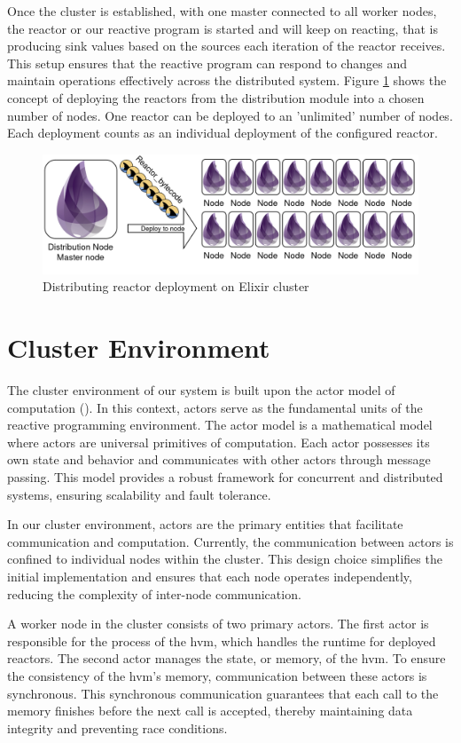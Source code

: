 \documentclass[a4paper]{book}
\begin{document}
Once the cluster is established, with one master connected to all worker nodes, the reactor or our reactive program is started and will keep on reacting, that is producing sink values based on the sources each iteration of the reactor receives. This setup ensures that the reactive program can respond to changes and maintain operations effectively across the distributed system. Figure \ref{fig:rdi} shows the concept of deploying the reactors from the distribution module into a chosen number of nodes. One reactor can be deployed to an 'unlimited' number of nodes. Each deployment counts as an individual deployment of the configured reactor. 

\begin{figure}[h]
	\includegraphics[width=\textwidth]{distribution300.drawio}
	\caption{Distributing reactor deployment on Elixir cluster}
	\label{fig:rdi}
\end{figure}  

\section{Cluster Environment}
The cluster environment of our system is built upon the actor model of computation (\cite{hewitt:hal-01163534}). In this context, actors serve as the fundamental units of the reactive programming environment. The actor model is a mathematical model where actors are universal primitives of computation. Each actor possesses its own state and behavior and communicates with other actors through message passing. This model provides a robust framework for concurrent and distributed systems, ensuring scalability and fault tolerance.

In our cluster environment, actors are the primary entities that facilitate communication and computation. Currently, the communication between actors is confined to individual nodes within the cluster. This design choice simplifies the initial implementation and ensures that each node operates independently, reducing the complexity of inter-node communication.

A worker node in the cluster consists of two primary actors. The first actor is responsible for the process of the hvm, which handles the runtime for deployed reactors. The second actor manages the state, or memory, of the hvm. To ensure the consistency of the hvm's memory, communication between these actors is synchronous. This synchronous communication guarantees that each call to the memory finishes before the next call is accepted, thereby maintaining data integrity and preventing race conditions.
\end{document}
